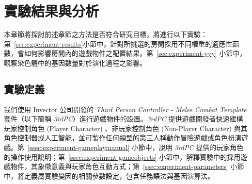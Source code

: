 \newcommand{\gasettingstable}[4]{{
\begin{table}[H]
  \centering
  \caption{#1}
  \label{#2}
  \bigskip
  \vspace{-5mm}
  \begin{minipage}[t]{0.48\linewidth}
    \begin{tabular}[t]{| c | c | c |}
      \hline
      \multicolumn{1}{ |c| }{回合次數}
        & \multicolumn{1}{ c| }{世代數量}
        & \multicolumn{1}{ c| }{個體數量} \\\hline
      #3
      \hline
    \end{tabular}
  \end{minipage}
  \begin{minipage}[t]{0.48\linewidth}
    \begin{tabular}[t]{| c | c | c |}
      \hline
      \multicolumn{1}{ |c| }{指標}
        & \multicolumn{1}{ c| }{權重}
        & \multicolumn{1}{ c| }{備注} \\\hline
      #4
      \hline
    \end{tabular}
  \end{minipage}
\end{table}
}}


\chapter{實驗結果與分析}
\label{cha:experiment}

本章節將探討前述章節之方法是否符合研究目標，將進行以下實驗：第~\ref{sec:experiment-results}小節中，針對所挑選的房間採用不同權重的適應性函數，會如何影響房間內的遊戲物件之配置結果。第~\ref{sec:experiment-yyy} 小節中，觀察染色體中的基因數量對於演化過程之影響。

\section{實驗定義}
\label{sec:experiment-definition}

我們使用 Invector 公司開發的 \textit{Third Person Controller - Melee Combat Template} 套件（以下簡稱 \textit{3rdPC}）進行遊戲物件的設置。\textit{3rdPC} 提供遊戲開發者快速建構玩家控制角色 (Player Character) 、非玩家控制角色 (Non-Player Character) 與其角色控制器或人工智能，並可製作任何類型的第三人稱動作冒險遊戲或角色扮演遊戲。第~\ref{ssec:experiment-gameplaymanual} 小節中，說明 \textit{3rdPC} 提供的玩家角色的操作使用說明；第~\ref{ssec:experiment-gameobjects} 小節中，解釋實驗中的採用遊戲物件，其象徵意義與玩家角色互動方式；第~\ref{ssec:experiment-parameters} 小節中，將定義屬實驗變因的相關參數設定，包含任務語法與基因演算法。

